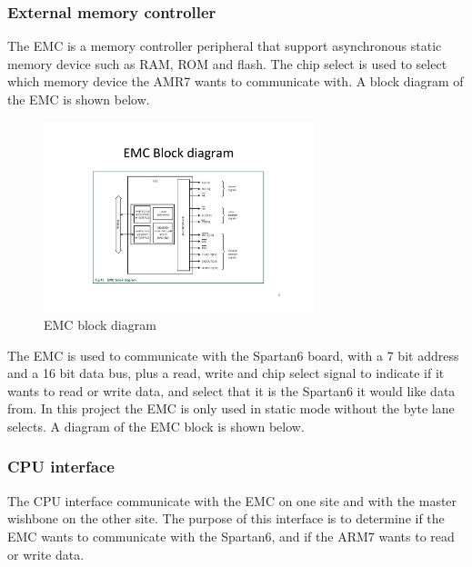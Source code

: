 \subsubsection{External memory controller}
The EMC is a memory controller peripheral that support asynchronous static memory device such as RAM, ROM and flash. The chip select is used to select which memory device the AMR7 wants to communicate with. A block diagram of the EMC is shown below.
\begin{figure}[H]
	\begin{centering}
		 \includegraphics[width=0.7\textwidth]{images/emb_block_diagram.pdf}
		\caption{EMC block diagram}
	\end{centering}
\end{figure}
The EMC is used to communicate with the Spartan6 board, with a 7 bit address and a 16 bit data bus, plus a read, write and chip select signal to indicate if it wants to read or write data, and select that it is the Spartan6 it would like data from. In this project the EMC is only used in static mode without the byte lane selects. A diagram of the EMC block is shown below.
\subsubsection{CPU interface}
The CPU interface communicate with the EMC on one site and with the master wishbone on the other site. The purpose of this interface is to determine if the EMC wants to communicate with the Spartan6, and if the ARM7 wants to read or write data.

